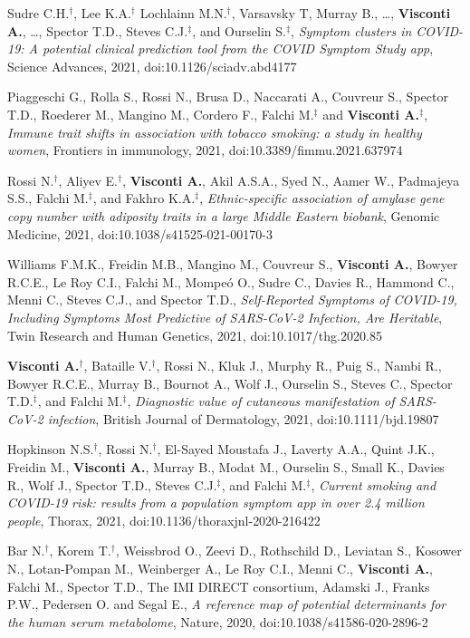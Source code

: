 \documentclass[a4paper,10pt]{article}
\begin{document}
{\begin{itemize}
		 Sudre C.H.$^{\textbf{$\dag $}}$, Lee K.A.$^{\textbf{$\dag $}}$ Lochlainn M.N.$^{\textbf{$\dag $}}$, Varsavsky T, Murray B., \dots, \textbf{Visconti A.}, \dots, Spector T.D., Steves C.J.$^{\textbf{$\ddag $}}$, and Ourselin S.$^{\textbf{$\ddag $}}$, \emph{Symptom clusters in COVID-19: A potential clinical prediction tool from the COVID Symptom Study app}, Science Advances, 2021, doi:10.1126/sciadv.abd4177

	    Piaggeschi G., Rolla S., Rossi N., Brusa D., Naccarati A., Couvreur S., Spector T.D., Roederer M., Mangino M., Cordero F., Falchi M.$^{\textbf{$\ddag $}}$ and \textbf{Visconti A.}$^{\textbf{$\ddag $}}$, \emph{Immune trait shifts in association with tobacco smoking: a study in healthy women}, Frontiers in immunology, 2021, doi:10.3389/fimmu.2021.637974

	    Rossi N.$^{\textbf{$\dag $}}$, Aliyev E.$^{\textbf{$\dag $}}$, \textbf{Visconti A.}, Akil A.S.A., Syed N., Aamer W., Padmajeya S.S., Falchi M.$^{\textbf{$\ddag $}}$, and Fakhro K.A.$^{\textbf{$\ddag $}}$, \emph{Ethnic-specific association of amylase gene copy number with adiposity traits in a large Middle Eastern biobank}, Genomic Medicine, 2021, doi:10.1038/s41525-021-00170-3

	   	Williams F.M.K., Freidin M.B., Mangino M., Couvreur S., \textbf{Visconti A.}, Bowyer R.C.E., Le Roy C.I., Falchi M., Mompe\'o O., Sudre C., Davies R., Hammond C., Menni C., Steves C.J., and Spector T.D., \emph{Self-Reported Symptoms of COVID-19, Including Symptoms Most Predictive of SARS-CoV-2 Infection, Are Heritable}, Twin Research and Human Genetics, 2021, doi:10.1017/thg.2020.85

	    \textbf{Visconti A.}$^{\textbf{$\dag $}}$, Bataille V.$^{\textbf{$\dag $}}$, Rossi N., Kluk J., Murphy R., Puig S., Nambi R., Bowyer R.C.E., Murray B., Bournot A., Wolf J., Ourselin S., Steves C., Spector T.D.$^{\textbf{$\ddag $}}$, and Falchi M.$^{\textbf{$\ddag $}}$, \emph{Diagnostic value of cutaneous manifestation of SARS-CoV-2 infection}, British Journal of Dermatology, 2021, doi:10.1111/bjd.19807

		 Hopkinson N.S.$^{\textbf{$\dag $}}$, Rossi N.$^{\textbf{$\dag $}}$, El-Sayed Moustafa J., Laverty A.A., Quint J.K., Freidin M., \textbf{Visconti A.}, Murray B., Modat M., Ourselin S., Small K., Davies R., Wolf J., Spector T.D., Steves C.J.$^{\textbf{$\ddag $}}$, and Falchi M.$^{\textbf{$\ddag $}}$, \emph{Current smoking and COVID-19 risk: results from a population symptom app in over 2.4 million people}, Thorax, 2021, doi:10.1136/thoraxjnl-2020-216422

		 Bar N.$^{\textbf{$\dag $}}$, Korem T.$^{\textbf{$\dag $}}$, Weissbrod O., Zeevi D., Rothschild D., Leviatan S., Kosower N., Lotan-Pompan M., Weinberger A., Le Roy C.I., Menni C., \textbf{Visconti A.}, Falchi M., Spector T.D., The IMI DIRECT consortium, Adamski J., Franks P.W., Pedersen O. and Segal E., \emph{A reference map of potential determinants for the human serum metabolome}, Nature, 2020, doi:10.1038/s41586-020-2896-2
		
	\end{itemize}
}
\end{document}

